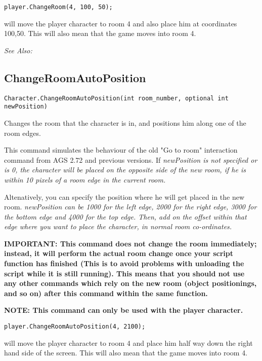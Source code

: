 \begin{verbatim}
player.ChangeRoom(4, 100, 50);
\end{verbatim}
will move the player character to room 4 and also place him at coordinates 100,50.
This will also mean that the game moves into room 4.

\it{See Also:} 



\subsection{ChangeRoomAutoPosition}\label{Character.ChangeRoomAutoPosition}%

\begin{verbatim}
Character.ChangeRoomAutoPosition(int room_number, optional int newPosition)
\end{verbatim}

Changes the room that the character is in, and positions him along one of the room edges.

This command simulates the behaviour of the old "Go to room" interaction command from AGS 2.72
and previous versions. If \it{newPosition} is not specified or is 0, the character will be
placed on the opposite side of the new room, if he is within 10 pixels of a room edge in the
current room.

Altenatively, you can specify the position where he will get placed in the new room.
\it{newPosition} can be 1000 for the left edge, 2000 for the right edge, 3000 for the
bottom edge and 4000 for the top edge. Then, add on the offset within that edge where
you want to place the character, in normal room co-ordinates.

\bf{IMPORTANT:} This command does not change the room immediately; instead, it
will perform the actual room change once your script function has finished
(This is to avoid problems with unloading the script while it is still
running). This means that you should not use any other commands which rely
on the new room (object positionings, and so on) after this command within
the same function.

\bf{NOTE:} This command can only be used with the player character.

\begin{verbatim}
player.ChangeRoomAutoPosition(4, 2100);
\end{verbatim}
will move the player character to room 4 and place him half way down the right hand side of the screen.
This will also mean that the game moves into room 4.

